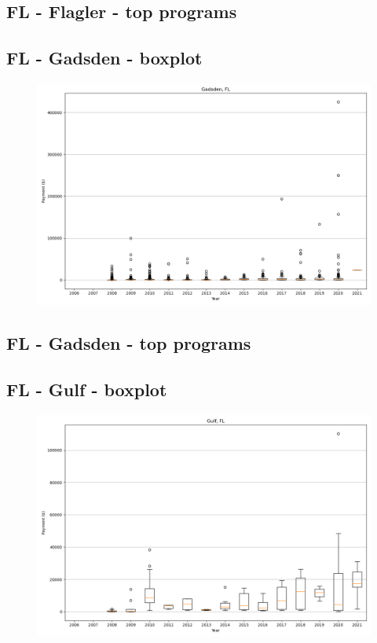 \subsection*{FL - Flagler - top programs}

\newpage
\subsection*{FL - Gadsden - boxplot}
\begin{figure}[h]
\centering
\includegraphics[width=7in]{../output/boxplots/counties/Gadsden-FL_boxplot.png}
\end{figure}


\subsection*{FL - Gadsden - top programs}

\newpage
\subsection*{FL - Gulf - boxplot}
\begin{figure}[h]
\centering
\includegraphics[width=7in]{../output/boxplots/counties/Gulf-FL_boxplot.png}
\end{figure}


